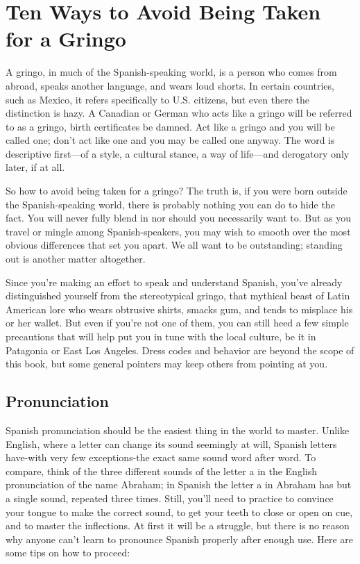 \chapter{Ten Ways to Avoid Being Taken for a Gringo}

A gringo, in much of the Spanish-speaking world, is a person
who comes from abroad, speaks another language, and wears loud
shorts. In certain countries, such as Mexico, it refers specifically to
U.S. citizens, but even there the distinction is hazy. A Canadian or
German who acts like a gringo will be referred to as a gringo, birth certificates be damned. Act like a gringo and you will be called one; don't
act like one and you may be called one anyway. The word is descriptive
first---of a style, a cultural stance, a way of life---and derogatory only
later, if at all.

So how to avoid being taken for a gringo? The truth is, if you
were born outside the Spanish-speaking world, there is probably nothing you can do to hide the fact. You will never fully blend in nor
should you necessarily want to. But as you travel or mingle among
Spanish-speakers, you may wish to smooth over the most obvious differences that set you apart. We all want to be outstanding; standing out
is another matter altogether.

Since you're making an effort to speak and understand Spanish, you've already distinguished yourself from the stereotypical
gringo, that mythical beast of Latin American lore who wears obtrusive shirts, smacks gum, and tends to misplace his or her wallet. But
even if you're not one of them, you can still heed a few simple precautions that will help put you in tune with the local culture, be it in Patagonia or East Los Angeles. Dress codes and behavior are beyond the
scope of this book, but some general pointers may keep others from
pointing at you.

\section{Pronunciation}

Spanish pronunciation should be the easiest thing in the world
to master. Unlike English, where a letter can change its sound seemingly at will, Spanish letters have-with very few exceptions-the exact same sound word after word. To compare, think of the three different sounds of the letter a in the English pronunciation of the name
Abraham; in Spanish the letter a in Abraham has but a single sound,
repeated three times. Still, you'll need to practice to convince your
tongue to make the correct sound, to get your teeth to close or open on
cue, and to master the inflections. At first it will be a struggle, but
there is no reason why anyone can't learn to pronounce Spanish properly after enough use. Here are some tips on how to proceed:

